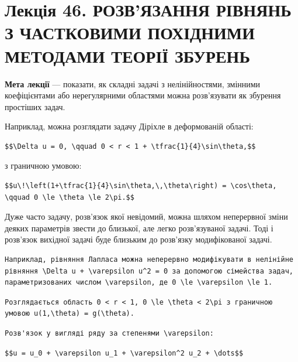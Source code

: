 \documentclass[
  ukrainian,
]{article}
\begin{document}
\section{Лекція 46. РОЗВ'ЯЗАННЯ РІВНЯНЬ З ЧАСТКОВИМИ ПОХІДНИМИ МЕТОДАМИ
ТЕОРІЇ
ЗБУРЕНЬ}\label{ux43bux435ux43aux446ux456ux44f-46.-ux440ux43eux437ux432ux44fux437ux430ux43dux43dux44f-ux440ux456ux432ux43dux44fux43dux44c-ux437-ux447ux430ux441ux442ux43aux43eux432ux438ux43cux438-ux43fux43eux445ux456ux434ux43dux438ux43cux438-ux43cux435ux442ux43eux434ux430ux43cux438-ux442ux435ux43eux440ux456ux457-ux437ux431ux443ux440ux435ux43dux44c}

\textbf{Мета лекції} --- показати, як складні задачі з нелінійностями,
змінними коефіцієнтами або нерегулярними областями можна розв'язувати як
збурення простіших задач.

Наприклад, можна розглядати задачу Діріхле в деформованій області:

\begin{verbatim}
$$\Delta u = 0, \qquad 0 < r < 1 + \tfrac{1}{4}\sin\theta,$$
\end{verbatim}

з граничною умовою:

\begin{verbatim}
$$u\!\left(1+\tfrac{1}{4}\sin\theta,\,\theta\right) = \cos\theta, \qquad 0 \le \theta \le 2\pi.$$
\end{verbatim}

Дуже часто задачу, розв'язок якої невідомий, можна шляхом неперервної
зміни деяких параметрів звести до близької, але легко розв'язуваної
задачі. Тоді і розв'язок вихідної задачі буде близьким до розв'язку
модифікованої задачі.

\begin{verbatim}
Наприклад, рівняння Лапласа можна неперервно модифікувати в нелінійне рівняння \Delta u + \varepsilon u^2 = 0 за допомогою сімейства задач, параметризованих числом \varepsilon, де 0 \le \varepsilon \le 1.
\end{verbatim}

\begin{verbatim}
Розглядається область 0 < r < 1, 0 \le \theta < 2\pi з граничною умовою u(1,\theta) = g(\theta).
\end{verbatim}

\begin{verbatim}
Розв'язок у вигляді ряду за степенями \varepsilon:
\end{verbatim}

\begin{verbatim}
$$u = u_0 + \varepsilon u_1 + \varepsilon^2 u_2 + \dots$$
\end{verbatim}
\end{document}
